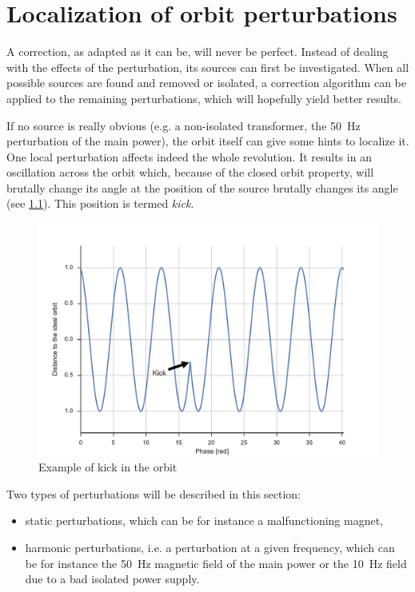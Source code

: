 
\chapter{Localization of orbit perturbations}
\label{sec:localization}

 A correction, as adapted as it can be, will never be perfect. Instead of dealing with the effects of the perturbation, its sources can first be investigated. When all possible sources are found and removed or isolated, a correction algorithm can be applied to the remaining perturbations, which will hopefully yield better results.

 If no source is really obvious (e.g. a non-isolated transformer, the \SI{50}{\hertz} perturbation of the main power), the orbit itself can give some hints to localize it. One local perturbation affects indeed the whole revolution. It results in an oscillation across the orbit which, because of the closed orbit property, will brutally change its angle at the position of the source  brutally changes its angle (see \cref{fig:kick}). This position is termed \textit{kick}.

\begin{figure}[!h]
	\centering
	\includegraphics[width=.9\linewidth]{img/kick}
	\caption{\label{fig:kick}Example of kick in the orbit}
\end{figure}

Two types of perturbations will be described in this section:
\begin{itemize}
	\item static perturbations, which can be  for instance a malfunctioning magnet,
	\item harmonic perturbations, i.e. a perturbation at a given frequency, which can be for instance the \SI{50}{Hz} magnetic field of the main power or the \SI{10}{Hz} field due to a bad isolated power supply.
\end{itemize}

